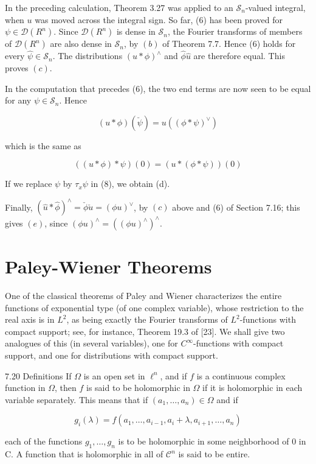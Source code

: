 \documentclass[10pt]{article}
\begin{document}
In the preceding calculation, Theorem 3.27 was applied to an $\mathscr{S}_{n}$-valued integral, when $u$ was moved across the integral sign. So far, (6) has been proved for $\psi \in \mathscr{D}\left(R^{n}\right)$. Since $\mathscr{D}\left(R^{n}\right)$ is dense in $\mathscr{S}_{n}$, the Fourier transforms of members of $\mathscr{D}\left(R^{n}\right)$ are also dense in $\mathscr{S}_{n}$, by $(b)$ of Theorem 7.7. Hence (6) holds for every $\hat{\psi} \in \mathscr{S}_{n}$. The distributions $(u * \phi)^{\wedge}$ and $\hat{\phi} \hat{u}$ are therefore equal. This proves $(c)$.

In the computation that precedes (6), the two end terms are now seen to be equal for any $\psi \in \mathscr{S}_{n}$. Hence

$$
(u * \phi)(\breve{\psi})=u\left((\phi * \psi)^{\vee}\right)
$$

which is the same as

$$
((u * \phi) * \psi)(0)=(u *(\phi * \psi))(0)
$$

If we replace $\psi$ by $\tau_{x} \psi$ in (8), we obtain (d).

Finally, $(\hat{u} * \hat{\phi})^{\wedge}=\check{\phi} \check{u}=(\phi u)^{\vee}$, by $(c)$ above and (6) of Section 7.16; this gives $(e)$, since $(\phi u)^{\wedge}=\left((\phi u)^{\wedge}\right)^{\wedge}$.

\section{Paley-Wiener Theorems}
One of the classical theorems of Paley and Wiener characterizes the entire functions of exponential type (of one complex variable), whose restriction to the real axis is in $L^{2}$, as being exactly the Fourier transforms of $L^{2}$-functions with compact support; see, for instance, Theorem 19.3 of [23]. We shall give two analogues of this (in several variables), one for $C^{\infty}$-functions with compact support, and one for distributions with compact support.

7.20 Definitions If $\Omega$ is an open set in $\ell^{n}$, and if $f$ is a continuous complex function in $\Omega$, then $f$ is said to be holomorphic in $\Omega$ if it is holomorphic in each variable separately. This means that if $\left(a_{1}, \ldots, a_{n}\right) \in \Omega$ and if

$$
g_{i}(\lambda)=f\left(a_{1}, \ldots, a_{i-1}, a_{i}+\lambda, a_{i+1}, \ldots, a_{n}\right)
$$

each of the functions $g_{1}, \ldots, g_{n}$ is to be holomorphic in some neighborhood of 0 in C. A function that is holomorphic in all of $\mathscr{C}^{n}$ is said to be entire.
\end{document}
